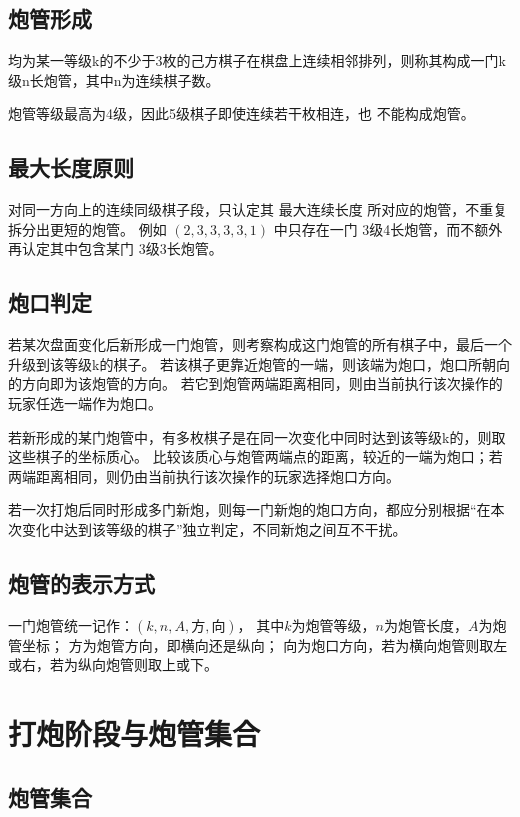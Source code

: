 \documentclass[12pt]{ctexart}
\begin{document}
\subsection{炮管形成}

均为某一等级k的不少于3枚的己方棋子在棋盘上连续相邻排列，则称其构成一门k级n长炮管，其中n为连续棋子数。

炮管等级最高为4级，因此5级棋子即使连续若干枚相连，也 不能构成炮管。

\subsection{最大长度原则}

对同一方向上的连续同级棋子段，只认定其 最大连续长度 所对应的炮管，不重复拆分出更短的炮管。
例如 $(2,3,3,3,3,1)$ 中只存在一门 3级4长炮管，而不额外再认定其中包含某门 3级3长炮管。

\subsection{炮口判定}

若某次盘面变化后新形成一门炮管，则考察构成这门炮管的所有棋子中，最后一个升级到该等级k的棋子。
若该棋子更靠近炮管的一端，则该端为炮口，炮口所朝向的方向即为该炮管的方向。
若它到炮管两端距离相同，则由当前执行该次操作的玩家任选一端作为炮口。

若新形成的某门炮管中，有多枚棋子是在同一次变化中同时达到该等级k的，则取这些棋子的坐标质心。
比较该质心与炮管两端点的距离，较近的一端为炮口；若两端距离相同，则仍由当前执行该次操作的玩家选择炮口方向。

若一次打炮后同时形成多门新炮，则每一门新炮的炮口方向，都应分别根据“在本次变化中达到该等级的棋子”独立判定，不同新炮之间互不干扰。

\subsection{炮管的表示方式}

一门炮管统一记作：$(k,n,A,\text{方},\text{向})$，
其中$k$为炮管等级，$n$为炮管长度，$A$为炮管坐标；
$\text{方}$为炮管方向，即横向还是纵向；
$\text{向}$为炮口方向，若为横向炮管则取左或右，若为纵向炮管则取上或下。

\section{打炮阶段与炮管集合}

\subsection{炮管集合}
\end{document}
